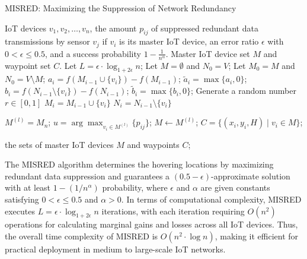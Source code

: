 \documentclass[sigconf]{acmart}
\begin{document}
\begin{algorithm}
\caption{MISRED: Maximizing the Suppression of Network Redundancy}
\begin{algorithmic}[1]
\Require IoT devices $v_1, v_2, \ldots, v_n$, the amount $p_{ij}$ of suppressed redundant data transmissions by sensor $v_j$ if $v_i$ is its master IoT device, an error ratio $\epsilon$ with $0 < \epsilon \leq 0.5$, and a success probability $1 - \frac{1}{n^\alpha}$.
\Ensure Master IoT device set $M$ and waypoint set $C$.
\State Let $L = \epsilon \cdot \log_{1 + 2\epsilon} n$;
\State Let $M = \emptyset$ and $N_0 = V$; 
    \State Let $M_0 = M$ and $N_0 = V \setminus M$;
        \State $a_i = f(M_{i-1} \cup \{v_i\}) - f(M_{i-1})$; $\tilde{a}_i = \max\{a_i, 0\}$;
        \State $b_i = f(N_{i-1} \setminus \{v_i\}) - f(N_{i-1})$; $\tilde{b}_i = \max\{b_i, 0\}$; 
        \State Generate a random number $r \in [0,1]$
            \State $M_i = M_{i-1} \cup \{v_i\}$
            \Else
            \State $N_i = N_{i-1} \setminus \{v_i\}$
            \EndIf

    \EndFor
    \State $M^{(l)} = M_n$;
        \State $u = \arg \max_{v_i \in M^{(l)}} \{p_{ij}\}$; 
    \EndFor 
        \State $M \gets M^{(l)}$;
    \EndIf
\EndFor
\State $C=\{(x_i, y_i, H) \mid v_i \in M\}$; 

\State \Return the sets of master IoT devices $M$ and waypoints $C$;
\end{algorithmic}
\end{algorithm}

The MISRED algorithm determines the hovering locations by maximizing redundant data suppression and guarantees a $(0.5-\epsilon)$-approximate solution with at least $1-(1/n^\alpha)$ probability, where $\epsilon$ and $\alpha$ are given constants satisfying $0 < \epsilon \leq 0.5$ and $\alpha > 0$. In terms of computational complexity, MISRED executes $L = \epsilon \cdot \log_{1 + 2\epsilon} n$ iterations, with each iteration requiring $O(n^2)$ operations for calculating marginal gains and losses across all IoT devices. Thus, the overall time complexity of MISRED is $O(n^2 \cdot \log n)$, making it efficient for practical deployment in medium to large-scale IoT networks.
\end{document}
